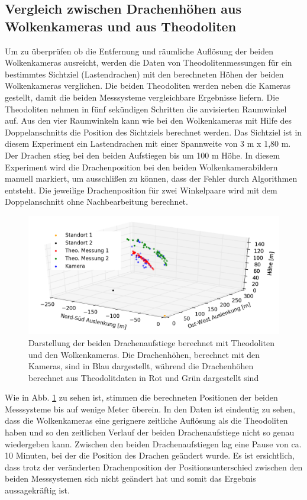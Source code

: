 \documentclass[a4paper,11pt,twoside,german]{article}
\newcommand{\absatz}{\smallbreak}
\begin{document}
\subsection{Vergleich zwischen Drachenhöhen aus Wolkenkameras und aus Theodoliten}
\label{SECDragon}
Um zu überprüfen ob die Entfernung und räumliche Auflösung der beiden Wolkenkameras ausreicht, werden die Daten von Theodolitenmessungen für ein bestimmtes Sichtziel (Lastendrachen) mit den berechneten Höhen der beiden Wolkenkameras verglichen.\absatz
Die beiden Theodoliten werden neben die Kameras gestellt, damit die beiden Messsysteme vergleichbare Ergebnisse liefern. Die Theodoliten nehmen in fünf sekündigen Schritten die anvisierten Raumwinkel auf. Aus den vier Raumwinkeln kann wie bei den Wolkenkameras mit Hilfe des Doppelanschnitts die Position des Sichtziels berechnet werden.\absatz
Das Sichtziel ist in diesem Experiment ein Lastendrachen mit einer Spannweite von 3 m x 1,80 m. Der Drachen stieg bei den beiden Aufstiegen bis um 100 m Höhe.\absatz
In diesem Experiment wird die Drachenposition bei den beiden Wolkenkamerabildern manuell markiert, um ausschlißen zu können, dass der Fehler durch Algorithmen entsteht. Die jeweilige Drachenposition für zwei Winkelpaare wird mit dem Doppelanschnitt ohne Nachbearbeitung berechnet.\absatz
\begin{figure}[h]
	\begin{center}
		\includegraphics[width=1\textwidth]{media/dragon_theo.png}
		\caption[Drachenaufstieg]{Darstellung der beiden Drachenaufstiege berechnet mit Theodoliten und den Wolkenkameras.  Die Drachenhöhen, berechnet mit den Kameras, sind in Blau dargestellt, während die Drachenhöhen berechnet aus Theodolitdaten in Rot und Grün dargestellt sind}
		\label{FIGTheoDragon}
	\end{center}
\end{figure}
Wie in Abb. \ref{FIGTheoDragon} zu sehen ist, stimmen die berechneten Positionen der beiden Messsysteme bis auf wenige Meter überein. In den Daten ist eindeutig zu sehen, dass die Wolkenkameras eine gerignere zeitliche Auflösung als die Theodoliten haben und so den zeitlichen Verlauf der beiden Drachenaufstiege nicht so genau wiedergeben kann. Zwischen den beiden Drachenaufstiegen lag eine Pause von ca. 10 Minuten, bei der die Position des Drachen geändert wurde. Es ist ersichtlich, dass trotz der veränderten Drachenposition der Positionsunterschied zwischen den beiden Messsystemen sich nicht geändert hat und somit das Ergebnis aussagekräftig ist.\absatz
\end{document}
